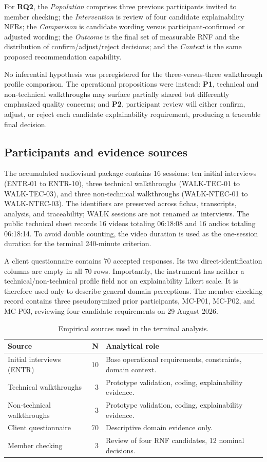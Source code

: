 \documentclass[pdflatex,sn-basic]{sn-jnl}
\begin{document}
For \textbf{RQ2}, the \emph{Population} comprises three previous participants invited to member checking; the \emph{Intervention} is review of four candidate explainability NFRs; the \emph{Comparison} is candidate wording versus participant-confirmed or adjusted wording; the \emph{Outcome} is the final set of measurable RNF and the distribution of confirm/adjust/reject decisions; and the \emph{Context} is the same proposed recommendation capability.

No inferential hypothesis was preregistered for the three-versus-three walkthrough profile comparison. The operational propositions were instead: \textbf{P1}, technical and non-technical walkthroughs may surface partially shared but differently emphasized quality concerns; and \textbf{P2}, participant review will either confirm, adjust, or reject each candidate explainability requirement, producing a traceable final decision.

\subsection{Participants and evidence sources}
The accumulated audiovisual package contains 16 sessions: ten initial interviews (ENTR-01 to ENTR-10), three technical walkthroughs (WALK-TEC-01 to WALK-TEC-03), and three non-technical walkthroughs (WALK-NTEC-01 to WALK-NTEC-03). The identifiers are preserved across fichas, transcripts, analysis, and traceability; WALK sessions are not renamed as interviews. The public technical sheet records 16 videos totaling 06:18:08 and 16 audios totaling 06:18:14. To avoid double counting, the video duration is used as the one-session duration for the terminal 240-minute criterion.

A client questionnaire contains 70 accepted responses. Its two direct-identification columns are empty in all 70 rows. Importantly, the instrument has neither a technical/non-technical profile field nor an explainability Likert scale. It is therefore used only to describe general domain perceptions. The member-checking record contains three pseudonymized prior participants, MC-P01, MC-P02, and MC-P03, reviewing four candidate requirements on 29 August 2026.

\begin{table}[H]
\caption{Empirical sources used in the terminal analysis.}\label{tab:corpus}
\centering\small
\begin{tabularx}{\textwidth}{@{}l r X@{}}
\toprule
Source & N & Analytical role \\
\midrule
Initial interviews (ENTR) & 10 & Base operational requirements, constraints, domain context.\\
Technical walkthroughs & 3 & Prototype validation, coding, explainability evidence.\\
Non-technical walkthroughs & 3 & Prototype validation, coding, explainability evidence.\\
Client questionnaire & 70 & Descriptive domain evidence only.\\
Member checking & 3 & Review of four RNF candidates, 12 nominal decisions.\\
\bottomrule
\end{tabularx}
\end{table}
\end{document}
